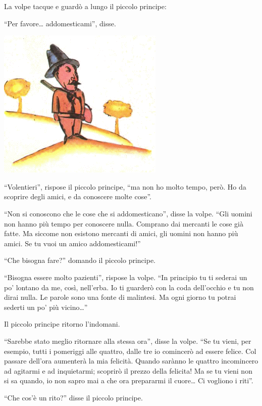 \documentclass[11pt]{scrbook}
\begin{document}
La volpe tacque e guardò a lungo il piccolo principe:

``Per favore\ldots{} addomesticami'', disse.

\begin{center}
\includegraphics{img/myslivec}
\end{center}

``Volentieri'', rispose il piccolo principe, ``ma non ho molto tempo, però. Ho da scoprire degli amici, e da conoscere molte cose''.

``Non si conoscono che le cose che si addomesticano'', disse la volpe. ``Gli uomini non hanno più tempo per conoscere nulla. Comprano dai mercanti le cose già fatte. Ma siccome non esistono mercanti di amici, gli uomini non hanno più amici. Se tu vuoi un amico addomesticami!''

``Che bisogna fare?'' domando il piccolo principe.

``Bisogna essere molto pazienti'', rispose la volpe. ``In principio tu ti sederai un po' lontano da me, così, nell'erba. Io ti guarderò con la coda dell'occhio e tu non dirai nulla. Le parole sono una fonte di malintesi. Ma ogni giorno tu potrai sederti un po' più vicino\ldots{}''

Il piccolo principe ritorno l'indomani.

``Sarebbe stato meglio ritornare alla stessa ora'', disse la volpe. ``Se tu vieni, per esempio, tutti i pomeriggi alle quattro, dalle tre io comincerò ad essere felice. Col passare dell'ora aumenterà la mia felicità. Quando sarànno le quattro incomincero ad agitarmi e ad inquietarmi; scoprirò il prezzo della felicita! Ma se tu vieni non si sa quando, io non sapro mai a che ora prepararmi il cuore\ldots{} Ci vogliono i riti''.

``Che cos'è un rito?'' disse il piccolo principe.
\end{document}
